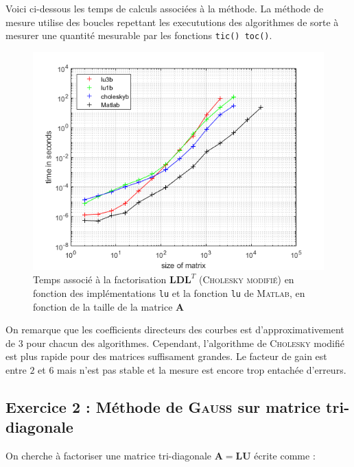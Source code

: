 \documentclass[12pt]{report}
\begin{document}
Voici ci-dessous les temps de calculs associées à la méthode. La méthode de mesure utilise des boucles repettant les execututions des algorithmes de sorte à mesurer une quantité mesurable par les fonctions \texttt{tic() toc()}.
\begin{figure}[H]
\includegraphics[scale = 1]{time.png}
\caption{Temps associé à la factorisation $\mathbf{LDL}^T$ (\textsc{Cholesky modifié}) en fonction des implémentations \texttt{lu} et la fonction \texttt{lu} de \textsc{Matlab}, en fonction de la taille de la matrice $\mathbf{A}$}
\end{figure}
On remarque que les coefficients directeurs des courbes est d'approximativement de $3$ pour chacun des algorithmes. Cependant, l'algorithme de \textsc{Cholesky} modifié est plus rapide pour des matrices suffisament grandes. Le facteur de gain est entre $2$ et $6$ mais n'est pas stable et la mesure est encore trop entachée d'erreurs. 

\subsection{Exercice 2 : Méthode de \textsc{Gauss} sur matrice tri-diagonale}

On cherche à factoriser une matrice tri-diagonale $\mathbf{A} = \mathbf{L} \mathbf{U}$ écrite comme :
\end{document}
